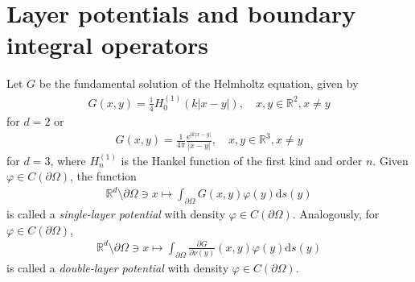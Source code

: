 \documentclass{article}
\theoremstyle{plain}
\theoremstyle{definition}
\begin{document}
\section{Layer potentials and boundary integral operators}
Let $G$ be the fundamental solution of the Helmholtz equation, given by
\begin{align*}
    G(x,y) = \frac{\mathrm i}{4}H^{(1)}_0(k|x-y|), \quad x,y\in\mathbb R^2,x\neq y
\end{align*}
for $d=2$ or
\begin{align*}
    G(x,y) = \frac{1}{4\pi} \frac{\mathrm e^{\mathrm ik|x-y|}}{|x-y|}, \quad x,y\in\mathbb R^3,x\neq y
\end{align*}
for $d=3$, where $H^{(1)}_n$ is the Hankel function of the first kind and order $n$. Given $\varphi\in C(\partial\Omega)$, the function
\begin{align*}
    \mathbb R^d\setminus \partial\Omega \ni x\mapsto \int_{\partial\Omega} G(x,y)\varphi(y)\mathrm ds(y)
\end{align*}
is called a \textit{single-layer potential} with density $\varphi\in C(\partial\Omega)$. Analogously, for $\varphi\in C(\partial\Omega)$, 
\begin{align*}
    \mathbb R^d\setminus \partial\Omega \ni x\mapsto \int_{\partial\Omega} \frac{\partial G}{\partial \nu(y)}(x,y)\varphi(y)\mathrm ds(y)
\end{align*}
is called a \textit{double-layer potential} with density $\varphi\in C(\partial\Omega)$.
\end{document}
